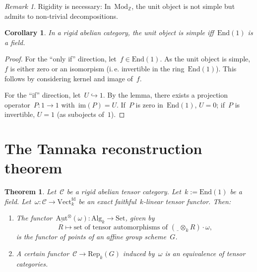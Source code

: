 \documentclass[a4paper,english,12pt]{scrartcl}
\theoremstyle{definition}
\theoremstyle{plain}
\newtheorem{thm}[defn]{Theorem}
\newtheorem{cor}[defn]{Corollary}
\theoremstyle{remark}
\newtheorem{rem}[defn]{Remark}
\newcommand{\ZZ}{\mathbb{Z}}
\newcommand{\C}{\mathcal{C}}
\renewcommand{\_}{\mathpunct{.}\,}
\newcommand{\?}{\,{:}\,}
\newcommand{\Mod}{\mathrm{Mod}}
\newcommand{\Set}{\mathrm{Set}}
\newcommand{\Vect}{\mathrm{Vect}}
\newcommand{\End}{\mathrm{End}}
\newcommand{\freist}{\underline{\ \ }}
\newcommand{\Rep}{\mathrm{Rep}}
\newcommand{\im}{\mathrm{im}}
\begin{document}
\begin{rem}Rigidity is necessary: In~$\Mod_\ZZ$, the unit object is not simple
but admits to non-trivial decompositions.\end{rem}

\begin{cor}In a rigid abelian category, the unit object is simple iff~$\End(1)$
is a field.\end{cor}
\begin{proof}For the ``only if'' direction, let~$f \in \End(1)$. As the unit
object is simple, $f$ is either zero or an isomorpism (i.\,e. invertible in the
ring~$\End(1)$). This follows by considering kernel and image of~$f$.

For the ``if'' direction, let~$U \hookrightarrow 1$. By the lemma, there exists
a projection operator~$P : 1 \to 1$ with~$\im(P) = U$. If~$P$ is zero
in~$\End(1)$, $U = 0$; if~$P$ is invertible, $U = 1$ (as subojects
of~$1$).\end{proof}


\section{The Tannaka reconstruction theorem}

\begin{thm}Let~$\C$ be a rigid abelian tensor category. Let~$k := \End(1)$ be a
field. Let~$\omega : \C \to \Vect_k^\text{fd}$ be an exact faithful~$k$-linear
tensor functor. Then:
\begin{enumerate}
\item The functor~$\underline{\mathrm{Aut}}^\otimes(\omega) : \mathrm{Alg}_k
\to \Set$, given by
\[ R \longmapsto \text{set of tensor automorphisms of~$(\freist \otimes_k R)
\cdot \omega$}, \]
is the functor of points of an affine group scheme~$G$.
\item A certain functor~$\C \to \Rep_k(G)$ induced by~$\omega$ is an
equivalence of tensor categories.
\end{enumerate}
\end{thm}
\end{document}
